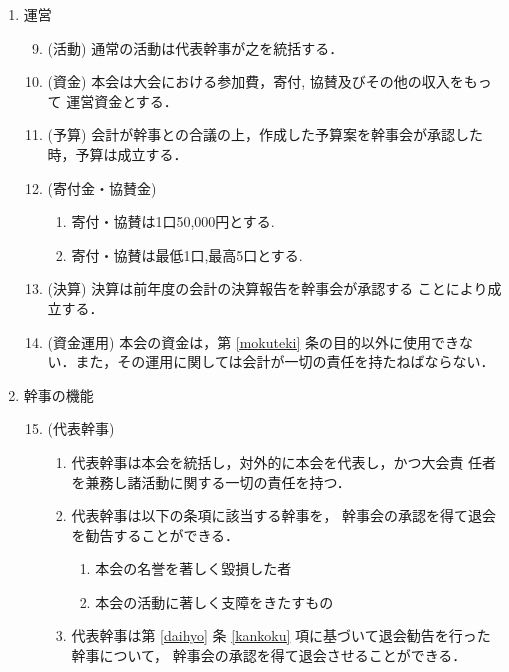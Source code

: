 \begin{enumerate}
\item	運営\\
%
\begin{enumerate}
\setcounter{enumii}{8}
\item	(活動) 通常の活動は代表幹事が之を統括する．\\
%
\item	(資金) 本会は大会における参加費，寄付, 協賛及びその他の収入をもって
運営資金とする．\\
%
\item (予算) 会計が幹事との合議の上，作成した予算案を幹事会が承認した時，予算は成立する．\\
%
\item (寄付金・協賛金) 
\begin{enumerate}
	\item	寄付・協賛は1口50,000円とする. \\
	\item	寄付・協賛は最低1口,最高5口とする. \\
\end{enumerate}
%
\item (決算) 決算は前年度の会計の決算報告を幹事会が承認する
ことにより成立する．\\
%
\item (資金運用) 本会の資金は，第 \ref{mokuteki} 条の目的以外に使用できな
い．また，その運用に関しては会計が一切の責任を持たねばならない．\\
%
\end{enumerate}
%
\item	幹事の機能\\
%
\begin{enumerate}
\setcounter{enumii}{14}
\item	\label{daihyo}(代表幹事)
\begin{enumerate}
	\item	代表幹事は本会を統括し，対外的に本会を代表し，かつ大会責
任者を兼務し諸活動に関する一切の責任を持つ．\\
	\item	\label{kankoku}代表幹事は以下の条項に該当する幹事を，
幹事会の承認を得て退会を勧告することができる．\\
		\begin{enumerate}
			\item	本会の名誉を著しく毀損した者\\
			\item	本会の活動に著しく支障をきたすもの\\
		\end{enumerate}
	\item	代表幹事は第 \ref{daihyo} 条 \ref{kankoku} 項に基づいて退会勧告を行った幹事について，
幹事会の承認を得て退会させることができる．\\


\end{enumerate}
\end{enumerate}
\end{enumerate}
